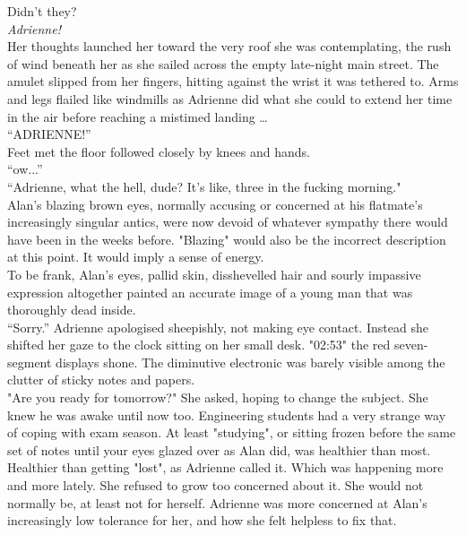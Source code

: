 Didn't they?\\

\textit{Adrienne!}\\

Her thoughts launched her toward the very roof she was contemplating, the rush of wind beneath her as she sailed across the empty late-night main street.
The amulet slipped from her fingers, hitting against the wrist it was tethered to.
Arms and legs flailed like windmills as Adrienne did what she could to extend her time in the air before reaching a mistimed landing \dots\\

``ADRIENNE!''\\

Feet met the floor followed closely by knees and hands.\\

``ow...''\\

``Adrienne, what the hell, dude? It's like, three in the fucking morning."\\

Alan's blazing brown eyes, normally accusing or concerned at his flatmate's increasingly singular antics, were now devoid of whatever sympathy there would have been in the weeks before.
"Blazing" would also be the incorrect description at this point.
It would imply a sense of energy.\\ 

To be frank, Alan's eyes, pallid skin, disshevelled hair and sourly impassive expression altogether painted an accurate image of a young man that was thoroughly dead inside.\\

``Sorry.'' Adrienne apologised sheepishly, not making eye contact. 
Instead she shifted her gaze to the clock sitting on her small desk.
"02:53" the red seven-segment displays shone.
The diminutive electronic was barely visible among the clutter of sticky notes and papers.\\

"Are you ready for tomorrow?" She asked, hoping to change the subject. She knew he was awake until now too. 
Engineering students had a very strange way of coping with exam season. 
At least "studying", or sitting frozen before the same set of notes until your eyes glazed over as Alan did, was healthier than most.\\

Healthier than getting "lost", as Adrienne called it. 
Which was happening more and more lately.
She refused to grow too concerned about it.
She would not normally be, at least not for herself.
Adrienne was more concerned at Alan's increasingly low tolerance for her, and how she felt helpless to fix that.\\

